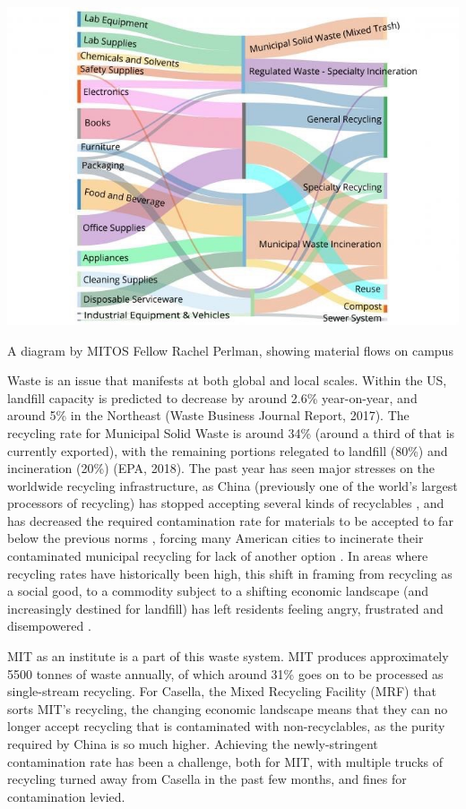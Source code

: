 \documentclass[nofonts,nols,justified,nobib]{tufte-book}
\begin{document}
\begin{marginfigure}
\includegraphics[width=\textwidth]{img/2/perlman-material.jpg}
\caption{A diagram by MITOS Fellow Rachel Perlman, showing material flows on campus \label{b}}
\end{marginfigure}

Waste is an issue that manifests at both global and local scales. Within the US, landfill capacity is predicted to decrease by around 2.6\% year-on-year, and around 5\% in the Northeast (Waste Business Journal Report, 2017). The recycling rate for Municipal Solid Waste is around 34\% (around a third of that is currently exported), with the remaining portions relegated to landfill (80\%) and incineration (20\%) (EPA, 2018). The past year has seen major stresses on the worldwide recycling infrastructure, as China (previously one of the world's largest processors of recycling) has stopped accepting several kinds of recyclables \cite{albeck-ripka_your_2018}, and has decreased the required contamination rate for materials to be accepted to far below the previous norms \cite{germin_chinas_2018}, forcing many American cities to incinerate their contaminated municipal recycling for lack of another option \cite{milman_moment_2019, albeck-ripka_your_2018}. In areas where recycling rates have historically been high, this shift in framing from recycling as a social good, to a commodity subject to a shifting economic landscape (and increasingly destined for landfill) has left residents feeling angry, frustrated and disempowered \cite{albeck-ripka_your_2018}.


MIT as an institute is a part of this waste system. MIT produces approximately 5500 tonnes of waste annually, of which around 31\% goes on to be processed as single-stream recycling. For Casella, the Mixed Recycling Facility (MRF) that sorts MIT's recycling, the changing economic landscape means that they can no longer accept recycling that is contaminated with non-recyclables, as the purity required by China is so much higher. Achieving the newly-stringent contamination rate has been a challenge, both for MIT, with multiple trucks of recycling turned away from Casella in the past few months, and fines for contamination levied.
\end{document}
